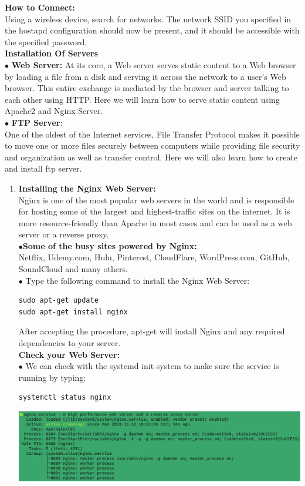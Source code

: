 \documentclass[journal,12pt,onecolumn]{IEEEtran}
\begin{document}
\begin{flushleft}
\textbf{How to Connect:} \\
Using a wireless device, search for networks. The network SSID you specified in the hostapd configuration should now be present, and it should be accessible with the specified password.\\
\medskip 
\textbf{Installation Of Servers} \\
$\bullet$ \textbf{Web Server:} At its core, a Web server serves static content to a Web browser by loading a file from a disk and serving it across the network to a user's Web browser. This entire exchange is mediated by the browser and server talking to each other using HTTP. Here we will learn how to serve static content using Apache2 and Nginx Server.  \\ 
\bigskip
$\bullet$ \textbf{FTP Server}: \\
One of the oldest of the Internet services, File Transfer Protocol makes it possible to move one or more files securely between computers while providing file security and organization as well as transfer control.
Here we will also learn how to create and install ftp server. \\
\bigskip
\begin{enumerate}
\item{\textbf{Installing the Nginx Web Server:}} \\
Nginx is one of the most popular web servers in the world and is responsible for hosting some of the largest and highest-traffic sites on the internet. It is more resource-friendly than Apache in most cases and can be used as a web server or a reverse proxy.\\
$\bullet$\textbf{Some of the busy sites powered by Nginx:}\\
Netflix, Udemy.com, Hulu, Pinterest, CloudFlare, WordPress.com, GitHub, SoundCloud and many others.\\
\bigskip
$\bullet$ Type the following command to install the Nginx Web Server: \\
\bigskip
\begin{lstlisting}[frame=single,linewidth=10cm,breaklines=true]
sudo apt-get update
sudo apt-get install nginx
\end{lstlisting}
\bigskip
After accepting the procedure, apt-get will install Nginx and any required dependencies to your server.\\
\bigskip
\textbf{Check your Web Server:} \\
\bigskip
$\bullet$ We can check with the systemd init system to make sure the service is running by typing:\\
\bigskip
\begin{lstlisting}[frame=single,linewidth=7cm,breaklines=true]
systemctl status nginx
\end{lstlisting}
\bigskip
\includegraphics[scale=.5]{img1.eps}


\end{enumerate}
\end{flushleft}
\end{document}
